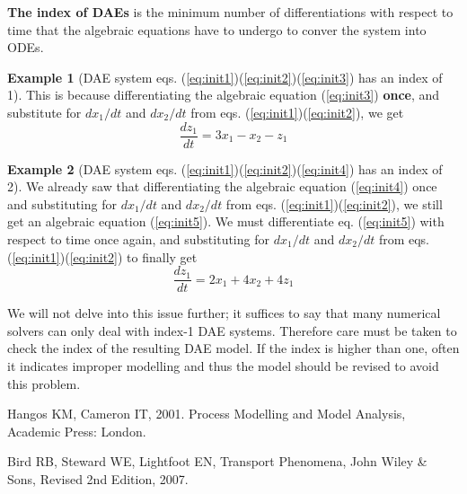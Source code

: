 \documentclass[a4paper,11pt]{article}
\theoremstyle{definition}
\newtheorem{exmp}{Example}[section]
\begin{document}
\textbf{The index of DAEs} is the minimum number of differentiations with respect
to time that the algebraic equations have to undergo to conver the system into ODEs.

\begin{exmp}[DAE system eqs. (\ref{eq:init1})(\ref{eq:init2})(\ref{eq:init3}) has an index of 1]
This is because differentiating the algebraic equation (\ref{eq:init3}) \textbf{once},
and substitute for $d x_1 / d t$ and $d x_2 / d t$ from 
eqs. (\ref{eq:init1})(\ref{eq:init2}), we get
\[ \frac{d z_1}{d t} = 3 x_1 - x_2 - z_1 \]
\end{exmp}

\begin{exmp}[DAE system eqs. (\ref{eq:init1})(\ref{eq:init2})(\ref{eq:init4}) has an index of 2]
We already saw that differentiating the algebraic equation (\ref{eq:init4}) once
and substituting for $d x_1 / d t$ and $d x_2 / d t$ from 
eqs. (\ref{eq:init1})(\ref{eq:init2}), we still get an algebraic equation (\ref{eq:init5}).
We must differentiate eq. (\ref{eq:init5}) with respect to time once again, 
and substituting for $d x_1 / d t$ and $d x_2 / d t$ from 
eqs. (\ref{eq:init1})(\ref{eq:init2}) to finally get
\[ \frac{d z_1}{d t} = 2 x_1 + 4 x_2 + 4 z_1 \]
\end{exmp}

We will not delve into this issue further; it suffices to say that many numerical solvers
can only deal with index-1 DAE systems. Therefore care must be taken to check
the index of the resulting DAE model. If the index is higher than one, often it indicates improper modelling and thus the model should be revised to avoid this problem.


\begin{thebibliography}{2}
\vspace{-0.4cm}
	Hangos KM, Cameron IT, 2001. Process Modelling and Model Analysis, Academic Press: London.

	Bird RB, Steward WE, Lightfoot EN, Transport Phenomena, John Wiley \& Sons, Revised 2nd Edition, 2007.
\end{thebibliography}
\end{document}
